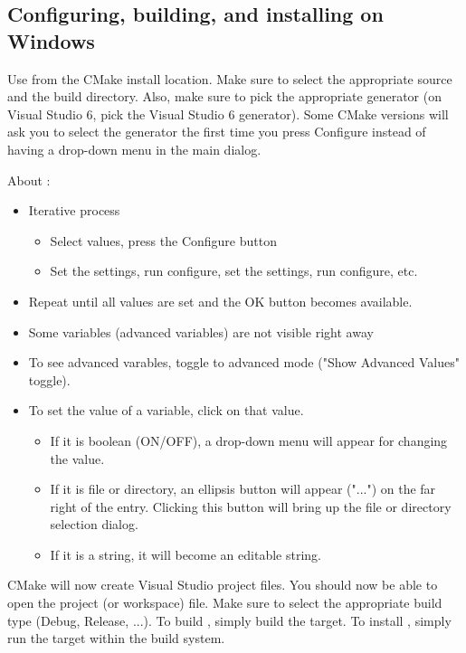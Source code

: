 \subsection{Configuring, building, and installing  on Windows}
Use  from the CMake install location.
Make sure to select the appropriate source and the build directory.
Also, make sure to pick the appropriate generator (on Visual Studio 6, 
pick the Visual Studio 6 generator). Some CMake versions will ask you 
to select the generator the first time you press Configure instead of 
having a drop-down menu in the main dialog. 

About :
\begin{itemize}
\item  Iterative process
  \begin{itemize}
  \item Select values, press the Configure button
  \item Set the settings, run configure, set the settings, run configure, etc. 
  \end{itemize}
\item Repeat until all values are set and the OK button becomes available.
\item Some variables (advanced variables) are not visible right away
\item To see advanced varables, toggle to advanced mode ("Show Advanced Values" toggle).
\item To set the value of a variable, click on that value.
  \begin{itemize}
  \item If it is boolean (ON/OFF), a drop-down menu will appear for changing the value.
  \item If it is file or directory, an ellipsis button will appear ("...") on the far right
  of the entry. Clicking this button will bring up the file or directory selection dialog.
  \item If it is a string, it will become an editable string. 
  \end{itemize}
\end{itemize}

CMake will now create Visual Studio project files. You should now be able to 
open the {\sundials} project (or workspace) file. Make sure to select the appropriate 
build type (Debug, Release, ...). To build {\sundials}, simply build the 
target. To install {\sundials}, simply run the  target within the build system.

